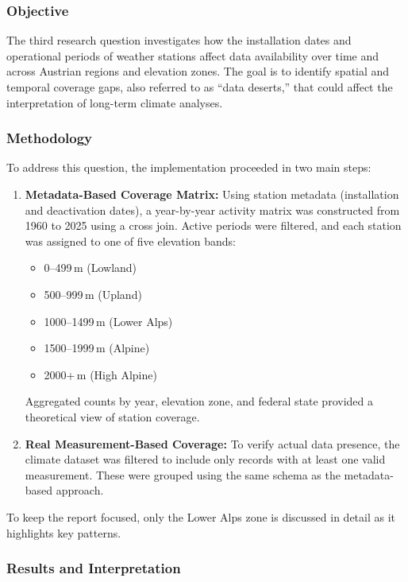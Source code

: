 \subsubsection{Objective}
The third research question investigates how the installation dates and operational periods of weather stations affect data availability over time and across Austrian regions and elevation zones. The goal is to identify spatial and temporal coverage gaps, also referred to as ``data deserts,'' that could affect the interpretation of long-term climate analyses.

\subsubsection{Methodology}

To address this question, the implementation proceeded in two main steps:

\begin{enumerate}
  \item \textbf{Metadata-Based Coverage Matrix:}  
    Using station metadata (installation and deactivation dates), a year-by-year activity matrix was constructed from 1960 to 2025 using a cross join. Active periods were filtered, and each station was assigned to one of five elevation bands:
    \begin{itemize}
      \item 0--499\,m (Lowland)
      \item 500--999\,m (Upland)
      \item 1000--1499\,m (Lower Alps)
      \item 1500--1999\,m (Alpine)
      \item 2000+\,m (High Alpine)
    \end{itemize}
    Aggregated counts by year, elevation zone, and federal state provided a theoretical view of station coverage.

  \item \textbf{Real Measurement-Based Coverage:}  
    To verify actual data presence, the climate dataset was filtered to include only records with at least one valid measurement. These were grouped using the same schema as the metadata-based approach.
\end{enumerate}

To keep the report focused, only the Lower Alps zone is discussed in detail as it highlights key patterns.

\subsubsection{Results and Interpretation}

